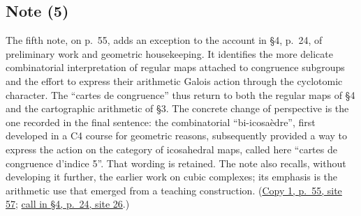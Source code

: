 \subsection*{Note (5)}
The fifth note, on p.~55, adds an exception to the account in \S4,
p.~24, of preliminary work and geometric housekeeping. It identifies
the more delicate combinatorial interpretation of regular maps attached
to congruence subgroups and the effort to express their arithmetic
Galois action through the cyclotomic character. The ``cartes de
congruence'' thus return to both the regular maps of \S4 and the
cartographic arithmetic of \S3. The concrete change of perspective is
the one recorded in the final sentence: the combinatorial
``bi-icosaèdre'', first developed in a C4 course for geometric reasons,
subsequently provided a way to express the action on the category of
icosahedral maps, called here ``cartes de congruence d'indice 5''.
That wording is retained. The note also recalls, without developing it
further, the earlier work on cubic complexes; its emphasis is the
arithmetic use that emerged from a teaching construction.
(\href{https://grothendieck.umontpellier.fr/web/viewer.html?file=../119.pdf\#page=58}{Copy 1, p.~55, site 57};
\href{https://grothendieck.umontpellier.fr/web/viewer.html?file=../119.pdf\#page=27}{call in \S4, p.~24, site 26}.)
